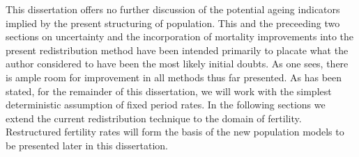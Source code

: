 This dissertation offers no further discussion of the
potential ageing indicators implied by the present structuring of population.
This and the preceeding two sections on uncertainty and the incorporation of
mortality improvements into the present redistribution method have been intended
primarily to placate what the author considered to have been the most likely
initial doubts. As one sees, there is ample room for improvement in all methods
thus far presented. As has been stated, for the remainder of this dissertation,
we will work with the simplest deterministic assumption of fixed period rates.
In the following sections we extend the current redistribution technique to the
domain of fertility. Restructured fertility rates will form the basis of the new
population models to be presented later in this dissertation.
\FloatBarrier